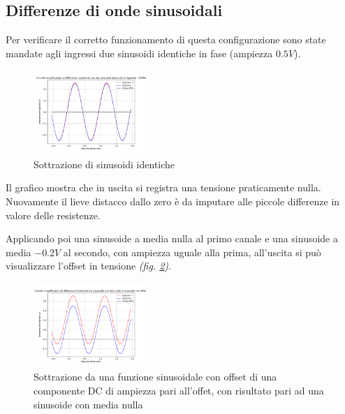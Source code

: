 \documentclass[journal]{IEEEtran}
\begin{document}
\subsection{Differenze di onde sinusoidali}
Per verificare il corretto funzionamento di questa configurazione sono state mandate agli ingressi due sinusoidi identiche in fase (ampiezza $0.5 V$). 

\begin{figure}[H]%
\begin {center}
\includegraphics[width=0.38\textwidth]{analysis/output/OPA_diff_sin2.pdf}
\caption{Sottrazione di sinusoidi identiche}
\label{fig:diff2}
\end {center}
\end{figure}

Il grafico mostra che in uscita si registra una tensione praticamente nulla. Nuovamente il lieve distacco dallo zero è da imputare alle piccole differenze in valore delle resistenze.

Applicando poi una sinusoide a media nulla al primo canale e una sinusoide a media $-0.2 V$ al secondo, con ampiezza uguale alla prima, all'uscita si può visualizzare l'offset in tensione \textit{(fig. \ref{fig:diff3})}. 

\begin{figure}[H]%
\begin {center}
\includegraphics[width=0.38\textwidth]{analysis/output/OPA_diff_sin3.pdf}
\caption{Sottrazione da una funzione sinusoidale con offset di una componente DC di ampiezza pari all'offet, con risultato pari ad una sinusoide con media nulla}
\label{fig:diff3}
\end {center}
\end{figure}
\end{document}
